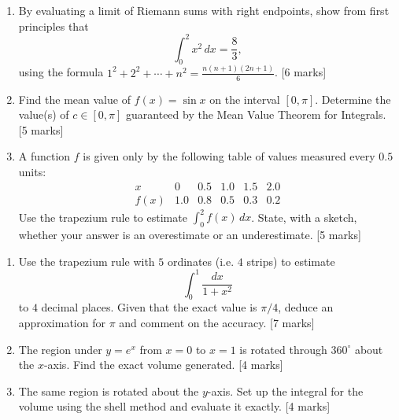 \documentclass[11pt]{article}
\newcounter{popsec}
\newcounter{popsub}
\newcommand{\courssub}[1]{%
  \stepcounter{popsub}%
  \par\vspace{9pt}\noindent{\popxbold\fontsize{11.5}{13}\selectfont\color{popink}{\color{poporange}\thepopsec.\thepopsub}\hspace{6pt}#1}\par\nopagebreak\vspace{4pt}
}
\begin{document}
\courssub{I prepare for the GCE}

\begin{exercice}
\begin{enumerate}
\item By evaluating a limit of Riemann sums with right endpoints, show from first principles that
\[
\int_0^2 x^2\,dx = \frac{8}{3},
\]
using the formula $1^2+2^2+\cdots+n^2 = \frac{n(n+1)(2n+1)}{6}$. \hfill [6 marks]
\item Find the mean value of $f(x) = \sin x$ on the interval $[0,\pi]$. Determine the value(s) of $c \in [0,\pi]$ guaranteed by the Mean Value Theorem for Integrals. \hfill [5 marks]
\item A function $f$ is given only by the following table of values measured every $0.5$ units:
\[
\begin{array}{c|ccccc}
x & 0 & 0.5 & 1.0 & 1.5 & 2.0 \\ \hline
f(x) & 1.0 & 0.8 & 0.5 & 0.3 & 0.2
\end{array}
\]
Use the trapezium rule to estimate $\int_0^2 f(x)\,dx$. State, with a sketch, whether your answer is an overestimate or an underestimate. \hfill [5 marks]
\end{enumerate}
\end{exercice}

\begin{exercice}
\begin{enumerate}
\item Use the trapezium rule with $5$ ordinates (i.e. $4$ strips) to estimate
\[
\int_0^1 \frac{dx}{1+x^2}
\]
to $4$ decimal places. Given that the exact value is $\pi/4$, deduce an approximation for $\pi$ and comment on the accuracy. \hfill [7 marks]
\item The region under $y = e^x$ from $x = 0$ to $x = 1$ is rotated through $360^\circ$ about the $x$-axis. Find the exact volume generated. \hfill [4 marks]
\item The same region is rotated about the $y$-axis. Set up the integral for the volume using the shell method and evaluate it exactly. \hfill [4 marks]
\end{enumerate}
\end{exercice}
\end{document}
